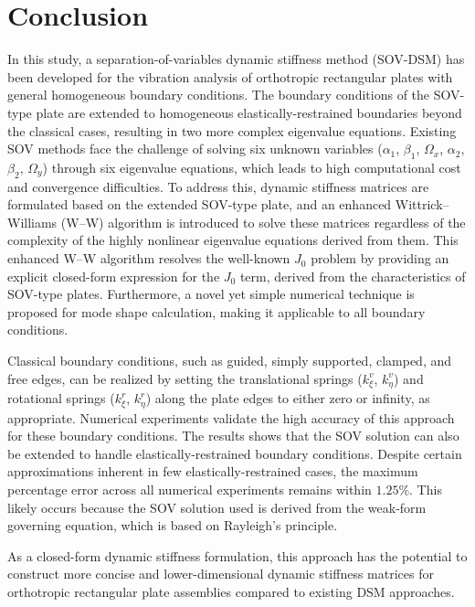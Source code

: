 \documentclass[preprint,12pt,number]{elsarticle}
\begin{document}
\FloatBarrier
\section{Conclusion}\label{sec:coclusion}
In this study, a separation-of-variables dynamic stiffness method (SOV-DSM) has been developed for the vibration analysis of orthotropic rectangular plates with general homogeneous boundary conditions. 
The boundary conditions of the SOV-type plate are extended to homogeneous elastically-restrained boundaries beyond the classical cases, resulting in two more complex eigenvalue equations. 
Existing SOV methods face the challenge of solving six unknown variables ($\alpha_1$, $\beta_1$, $\Omega_x$, $\alpha_2$, $\beta_2$, $\Omega_y$) through six eigenvalue equations, which leads to high computational cost and convergence difficulties. 
To address this, dynamic stiffness matrices are formulated based on the extended SOV-type plate, and an enhanced Wittrick–Williams (W–W) algorithm is introduced to solve these matrices regardless of the complexity of the highly nonlinear eigenvalue equations derived from them. 
This enhanced W–W algorithm resolves the well-known $J_0$ problem by providing an explicit closed-form expression for the $J_0$ term, derived from the characteristics of SOV-type plates. 
Furthermore, a novel yet simple numerical technique is proposed for mode shape calculation, making it applicable to all boundary conditions.

Classical boundary conditions, such as guided, simply supported, clamped, and free edges, can be realized by setting the translational springs ($k^v_{\xi}$, $k^v_{\eta}$) and rotational springs ($k^r_{\xi}$, $k^r_{\eta}$) along the plate edges to either zero or infinity, as appropriate.  
Numerical experiments validate the high accuracy of this approach for these boundary conditions.  
The results shows that the SOV solution can also be extended to handle elastically-restrained boundary conditions.
Despite certain approximations inherent in few elastically-restrained cases, the maximum percentage error across all numerical experiments remains within $1.25\%$. 
This likely occurs because the SOV solution used is derived from the weak-form governing equation, which is based on Rayleigh's principle.  

As a closed-form dynamic stiffness formulation, this approach has the potential to construct more concise and lower-dimensional dynamic stiffness matrices for orthotropic rectangular plate assemblies compared to existing DSM approaches.
\end{document}
